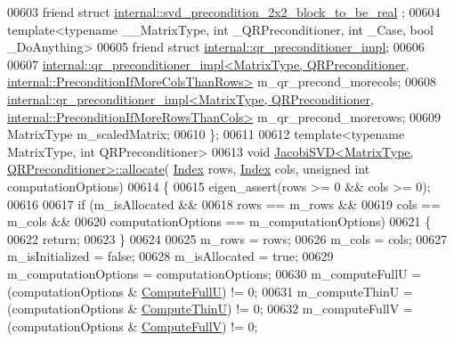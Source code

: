 \begin{DoxyCode}
00603     \textcolor{keyword}{friend} \textcolor{keyword}{struct }\hyperlink{struct_eigen_1_1internal_1_1svd__precondition__2x2__block__to__be__real}{internal::svd\_precondition\_2x2\_block\_to\_be\_real}
      ;
00604     \textcolor{keyword}{template}<\textcolor{keyword}{typename} \_\_MatrixType, \textcolor{keywordtype}{int} \_QRPreconditioner, \textcolor{keywordtype}{int} \_Case, \textcolor{keywordtype}{bool} \_DoAnything>
00605     \textcolor{keyword}{friend} \textcolor{keyword}{struct }\hyperlink{struct_eigen_1_1internal_1_1qr__preconditioner__impl}{internal::qr\_preconditioner\_impl};
00606 
00607     
      \hyperlink{struct_eigen_1_1internal_1_1qr__preconditioner__impl}{internal::qr\_preconditioner\_impl<MatrixType, QRPreconditioner, internal::PreconditionIfMoreColsThanRows>}
       m\_qr\_precond\_morecols;
00608     
      \hyperlink{struct_eigen_1_1internal_1_1qr__preconditioner__impl}{internal::qr\_preconditioner\_impl<MatrixType, QRPreconditioner, internal::PreconditionIfMoreRowsThanCols>}
       m\_qr\_precond\_morerows;
00609     MatrixType m\_scaledMatrix;
00610 \};
00611 
00612 \textcolor{keyword}{template}<\textcolor{keyword}{typename} MatrixType, \textcolor{keywordtype}{int} QRPreconditioner>
00613 \textcolor{keywordtype}{void} \hyperlink{group___s_v_d___module_class_eigen_1_1_jacobi_s_v_d}{JacobiSVD<MatrixType, QRPreconditioner>::allocate}(
      \hyperlink{group___s_v_d___module_a6229a37997eca1072b52cca5ee7a2bec}{Index} rows, \hyperlink{group___s_v_d___module_a6229a37997eca1072b52cca5ee7a2bec}{Index} cols, \textcolor{keywordtype}{unsigned} \textcolor{keywordtype}{int} computationOptions)
00614 \{
00615   eigen\_assert(rows >= 0 && cols >= 0);
00616 
00617   \textcolor{keywordflow}{if} (m\_isAllocated &&
00618       rows == m\_rows &&
00619       cols == m\_cols &&
00620       computationOptions == m\_computationOptions)
00621   \{
00622     \textcolor{keywordflow}{return};
00623   \}
00624 
00625   m\_rows = rows;
00626   m\_cols = cols;
00627   m\_isInitialized = \textcolor{keyword}{false};
00628   m\_isAllocated = \textcolor{keyword}{true};
00629   m\_computationOptions = computationOptions;
00630   m\_computeFullU = (computationOptions & \hyperlink{group__enums_ggae3e239fb70022eb8747994cf5d68b4a9a2b4f91ca5859a4159dbfe8090043817f}{ComputeFullU}) != 0;
00631   m\_computeThinU = (computationOptions & \hyperlink{group__enums_ggae3e239fb70022eb8747994cf5d68b4a9af8c742a1aa87773e165eae406c9ccaf8}{ComputeThinU}) != 0;
00632   m\_computeFullV = (computationOptions & \hyperlink{group__enums_ggae3e239fb70022eb8747994cf5d68b4a9a52c6f7e80bbf9a42297c88f700245b51}{ComputeFullV}) != 0;

\end{DoxyCode}
